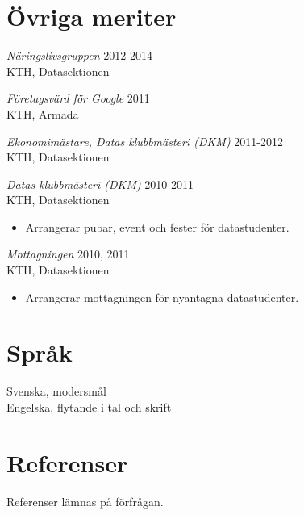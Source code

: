 \documentclass[margin, 10pt]{res} %
\begin{document}
\begin{resume}

\section{Övriga meriter}

{\sl Näringslivsgruppen} \hfill 2012-2014 \\
KTH, Datasektionen


{\sl Företagsvärd för Google} \hfill 2011 \\
KTH, Armada

{\sl Ekonomimästare, Datas klubbmästeri (DKM)} \hfill 2011-2012 \\
KTH, Datasektionen

{\sl Datas klubbmästeri (DKM)} \hfill 2010-2011 \\
KTH, Datasektionen
\begin{itemize} 
\item Arrangerar pubar, event och fester för datastudenter.
\end{itemize} 

{\sl Mottagningen} \hfill 2010, 2011 \\
KTH, Datasektionen
\begin{itemize} 
\item Arrangerar mottagningen för nyantagna datastudenter.
\end{itemize} 



\section{Språk}
Svenska, modersmål \\
Engelska, flytande i tal och skrift


\section{Referenser}
Referenser lämnas på förfrågan.


\end{resume}
\end{document}

